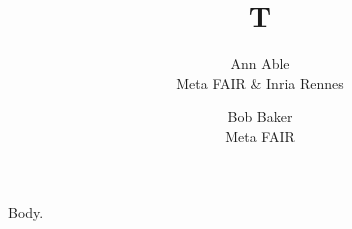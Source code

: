 \documentclass{article}
\title{T}
\author{Ann Able\\ Meta FAIR \& Inria Rennes
  \and Bob Baker\\ Meta FAIR}
\begin{document}
\maketitle
Body.
\end{document}
